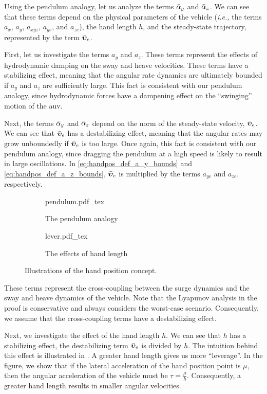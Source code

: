 Using the pendulum analogy, let us analyze the terms $\Bar{\alpha}_y$ and $\Bar{\alpha}_z$.
We can see that these terms depend on the physical parameters of the vehicle (\emph{i.e.,} the terms $a_x$, $a_y$, $a_{xyz}$, $a_{ye}$, and $a_{ze}$), the hand length $h$, and the steady-state trajectory, represented by the term $\Bar{\bm{\upsilon}}_e$.

First, let us investigate the terms $a_y$ and $a_z$.
These terms represent the effects of hydrodynamic damping on the sway and heave velocities.
These terms have a stabilizing effect, meaning that the angular rate dynamics are ultimately bounded if $a_y$ and $a_z$ are sufficiently large.
This fact is consistent with our pendulum analogy, since hydrodynamic forces have a dampening effect on the ``swinging'' motion of the \gls{auv}.

Next, the terms $\Bar{\alpha}_y$ and $\Bar{\alpha}_z$ depend on the norm of the steady-state velocity, $\Bar{\bm{\upsilon}}_e$.
We can see that $\Bar{\bm{\upsilon}}_e$ has a destabilizing effect, meaning that the angular rates may grow unboundedly if $\Bar{\bm{\upsilon}}_e$ is too large.
Once again, this fact is consistent with our pendulum analogy, since dragging the pendulum at a high speed is likely to result in large oscillations.
In \eqref{eq:handpos_def_a_y_bounds} and \eqref{eq:handpos_def_a_z_bounds}, $\Bar{\bm{\upsilon}}_e$ is multiplied by the terms $a_{ye}$ and $a_{ze}$, respectively.
\begin{figure}[hb]
    \centering
    \begin{subfigure}{0.45\textwidth}    
        \centering
        \def\svgwidth{\textwidth}
        {pendulum.pdf_tex}
        \caption{The pendulum analogy}
        \label{fig:handpos_def_pendulum}
    \end{subfigure}
    \begin{subfigure}{0.45\textwidth}    
        \centering
        \def\svgwidth{\textwidth}
        {lever.pdf_tex}
        \caption{The effects of hand length}
        \label{fig:handpos_def_lever}
    \end{subfigure}
    \caption{Illustrations of the hand position concept.}
\end{figure}
These terms represent the cross-coupling between the surge dynamics and the sway and heave dynamics of the vehicle.
Note that the Lyapunov analysis in the proof is conservative and always considers the worst-case scenario.
Consequently, we assume that the cross-coupling terms have a destabilizing effect.

Next, we investigate the effect of the hand length $h$.
We can see that $h$ has a stabilizing effect, the destabilizing term $\Bar{\bm{\upsilon}}_e$ is divided by $h$.
The intuition behind this effect is illustrated in .
A greater hand length gives us more ``leverage''.
In the figure, we show that if the lateral acceleration of the hand position point is $\mu$, then the angular acceleration of the vehicle must be $\tau = \frac{\mu}{h}$.
Consequently, a greater hand length results in smaller angular velocities.


